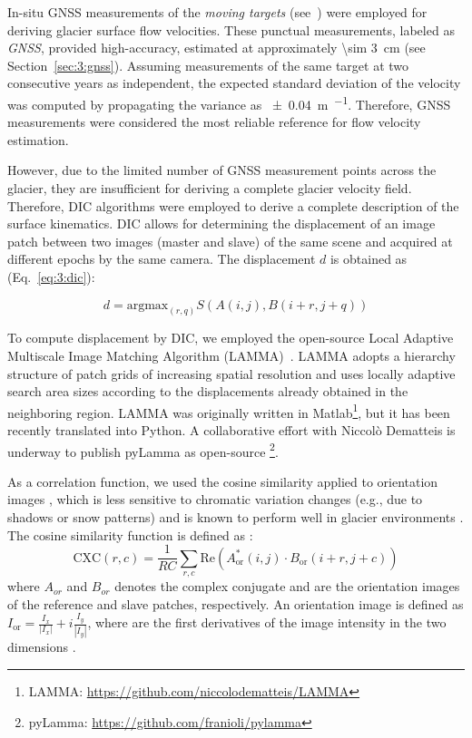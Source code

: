In-situ GNSS measurements of the \textit{moving targets} (see~) were employed for deriving glacier surface flow velocities.
These punctual measurements, labeled as \textit{GNSS}, provided high-accuracy, 
estimated at approximately \qty{\sim 3}{\centi\meter} (see Section~\ref{sec:3:gnss}).
Assuming measurements of the same target at two consecutive years as independent, the expected standard deviation of the velocity was computed by propagating the variance as \qty{\pm 0.04}{\meter\per\year}.
Therefore, GNSS measurements were considered the most reliable reference for flow velocity estimation.

However, due to the limited number of GNSS measurement points across the glacier, they are insufficient for deriving a complete glacier velocity field.
Therefore, DIC algorithms were employed to derive a complete description of the surface kinematics. 
DIC allows for determining the displacement of an image patch between two images (master and slave) of the same scene and acquired at different epochs by the same camera. The displacement \(d\) is obtained as  (Eq.~\ref{eq:3:dic}):

\begin{equation}
  d = \text{argmax}_{(r,q)} S(A(i,j),B(i+r,j+q))
  \label{eq:3:dic}
\end{equation}

To compute displacement by DIC, we employed the open-source Local Adaptive Multiscale Image Matching Algorithm (LAMMA)~\citep{Dematteis2022}.
LAMMA adopts a hierarchy structure of patch grids of increasing spatial resolution and uses locally adaptive search area sizes according to the displacements already
obtained in the neighboring region.
LAMMA was originally written in Matlab\footnote{LAMMA: \url{https://github.com/niccolodematteis/LAMMA}}, but it has been recently translated into Python.
A collaborative effort with Niccolò Dematteis is underway to publish pyLamma as open-source \footnote{pyLamma: \url{https://github.com/franioli/pylamma}}.

As a correlation function, we used the cosine similarity applied to orientation images \citep{Dematteis2021}, 
which is less sensitive to chromatic variation changes (e.g., due to shadows or snow patterns) and is known 
to perform well in glacier environments \citep{Heid2012_evaluation_xcorr, Dematteis2019}.
The cosine similarity function is defined as \citep{Dematteis2022}:
\begin{equation}
\text{CXC}(r,c) = \frac{1}{RC} \sum_{r,c} \mathrm{Re} \left( A_{\text{or}}^{*}(i,j) \cdot B_{\text{or}}(i+r,j+c) \right)
\end{equation}
where $A_{or}$ and $B_{or}$ denotes the complex conjugate and are the orientation images of the 
reference and slave patches, respectively. 
An orientation image is defined as $ I_{\text{or}} = \frac{I_x}{|I_x|} + i\frac{I_y}{|I_y|} $, 
where are the first derivatives of the image intensity in the two dimensions \citep{fitch2002_OC}.

